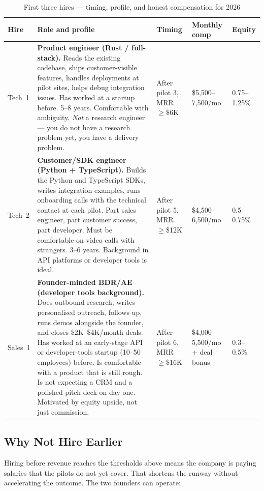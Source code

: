 \begin{table}[H]
\centering
\renewcommand{\arraystretch}{1.7}
\begin{tabularx}{\textwidth}{@{}lXlll@{}}
\toprule
\textbf{Hire} & \textbf{Role and profile} & \textbf{Timing} &
\textbf{Monthly comp} & \textbf{Equity} \\
\midrule
Tech~1 & \textbf{Product engineer (Rust / full-stack).} Reads the existing
  codebase, ships customer-visible features, handles deployments at pilot
  sites, helps debug integration issues. Has worked at a startup before.
  5--8 years. Comfortable with ambiguity. \emph{Not} a research engineer ---
  you do not have a research problem yet, you have a delivery problem.
  & After pilot 3, MRR $\geq$\$6K & \$5,500--7,500/mo & 0.75--1.25\% \\
\midrule
Tech~2 & \textbf{Customer/SDK engineer (Python + TypeScript).} Builds the
  Python and TypeScript SDKs, writes integration examples, runs onboarding
  calls with the technical contact at each pilot. Part sales engineer, part
  customer success, part developer. Must be comfortable on video calls with
  strangers. 3--6 years. Background in API platforms or developer tools is
  ideal.
  & After pilot 5, MRR $\geq$\$12K & \$4,500--6,500/mo & 0.5--0.75\% \\
\midrule
Sales~1 & \textbf{Founder-minded BDR/AE (developer tools background).} Does
  outbound research, writes personalised outreach, follows up, runs demos
  alongside the founder, and closes \$2K--\$4K/month deals. Has worked at
  an early-stage API or developer-tools startup (10--50 employees) before.
  Is comfortable with a product that is still rough. Is not expecting a CRM
  and a polished pitch deck on day one. Motivated by equity upside, not just
  commission.
  & After pilot 6, MRR $\geq$\$16K & \$4,000--5,500/mo + deal bonus & 0.3--0.5\% \\
\bottomrule
\end{tabularx}
\caption{First three hires --- timing, profile, and honest compensation for 2026}
\end{table}

\subsection*{Why Not Hire Earlier}

Hiring before revenue reaches the thresholds above means the company is
paying salaries that the pilots do not yet cover. That shortens the runway
without accelerating the outcome. The two founders can operate:

